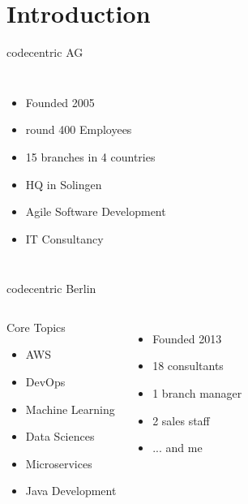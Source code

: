 \section{Introduction}


\begin{frame}{codecentric AG}

	\begin{columns}[T,onlytextwidth]
		
		\begin{itemize}
			\item Founded 2005
			\item round 400 Employees
			\item 15 branches in 4 countries
			\item HQ in Solingen
			\item Agile Software Development 
			\item IT Consultancy
		\end{itemize}
		
		
	\end{columns}

\end{frame}


\begin{frame}{codecentric Berlin}
	
	\begin{columns}[T,onlytextwidth]
		
		\begin{exampleblock}{Core Topics}
			\begin{itemize}
				\item[] AWS
				\item[] DevOps
				\item[] Machine Learning
				\item[] Data Sciences
				\item[] Microservices
				\item[] Java Development
			\end{itemize}
		\end{exampleblock}
		
		
		
		\begin{itemize}
			\item Founded 2013
			\item 18 consultants
			\item 1 branch manager
			\item 2 sales staff
			\item ... and me
		\end{itemize}
		

	\end{columns}	
\end{frame}




